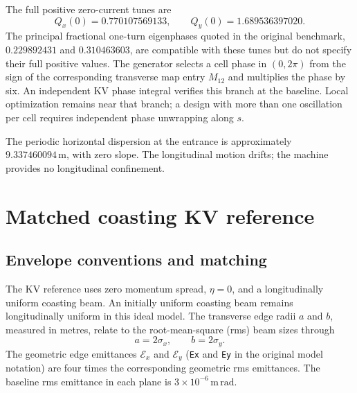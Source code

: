 \documentclass[11pt,a4paper]{article}
\numberwithin{equation}{section}
\newcommand{\units}[1]{\,\mathrm{#1}}
\begin{document}
The full positive zero-current tunes are
\begin{equation}
  Q_x(0)=0.770107569133,\qquad Q_y(0)=1.689536397020.
  \label{eq:bare-tunes}
\end{equation}
The principal fractional one-turn eigenphases quoted in the original
benchmark, $0.229892431$ and $0.310463603$, are compatible with these
tunes but do not specify their full positive values. The generator selects
a cell phase in $(0,2\pi)$ from the sign of the corresponding transverse
map entry $M_{12}$ and multiplies the phase by six. An independent KV
phase integral verifies this branch at the baseline. Local optimization
remains near that branch; a design with more than one oscillation per
cell requires independent phase unwrapping along $s$.

The periodic horizontal dispersion at the entrance is approximately
$9.337460094\units{m}$, with zero slope. The longitudinal motion drifts;
the machine provides no longitudinal confinement.

\section{Matched coasting KV reference}
\label{sec:kv}

\subsection{Envelope conventions and matching}

The KV reference uses zero momentum spread, $\eta=0$, and a
longitudinally uniform coasting beam. An initially uniform coasting beam
remains longitudinally uniform in this ideal model. The transverse edge
radii $a$ and $b$, measured in metres, relate to the root-mean-square
(rms) beam sizes through
\begin{equation}
  a=2\sigma_x,\qquad b=2\sigma_y.
  \label{eq:edge-radii}
\end{equation}
The geometric edge emittances $\mathcal E_x$ and $\mathcal E_y$
(\texttt{Ex} and \texttt{Ey} in the original model notation) are four times the corresponding geometric rms emittances. The baseline rms
emittance in each plane is $3\times10^{-6}\units{m\,rad}$.
\end{document}
